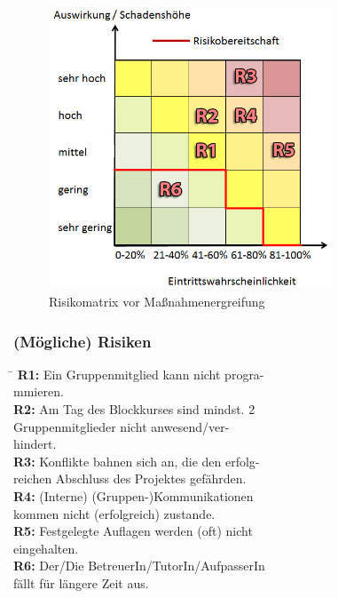 \documentclass[fontsize=12pt,paper=a4,twoside]{scrartcl}
\begin{document}
\begin{figure}[H]
	\centering
	\includegraphics[width=0.75\textwidth]{src/risikomatrix_before.png}
	\caption{Risikomatrix vor Maßnahmenergreifung}
	\label{fig:matrixtable_before}
\end{figure}

\subsubsection{(Mögliche) Risiken}


\begin{tabbing}
	\hspace*{5em}\= \kill
	\textbf{R1:}\> Ein Gruppenmitglied kann nicht progra-\\
				\> mmieren.\\[0.5em]
	\textbf{R2:}\> Am Tag des Blockkurses sind mindst. 2\\
				\> Gruppenmitglieder nicht anwesend/ver-\\
				\> hindert.\\[0.5em]
	\textbf{R3:}\> Konflikte bahnen sich an, die den erfolg-\\
				\> reichen Abschluss des Projektes gefährden.\\[0.5em]
	\textbf{R4:}\> (Interne) (Gruppen-)Kommunikationen\\ 
				\> kommen nicht (erfolgreich) zustande.\\[0.5em]
	\textbf{R5:}\> Festgelegte Auflagen werden (oft) nicht\\
				\> eingehalten.\\[0.5em]
	\textbf{R6:}\> Der/Die BetreuerIn/TutorIn/AufpasserIn\\
				\> fällt für längere Zeit aus.\\[0.5em]
\end{tabbing} 
\end{document}

